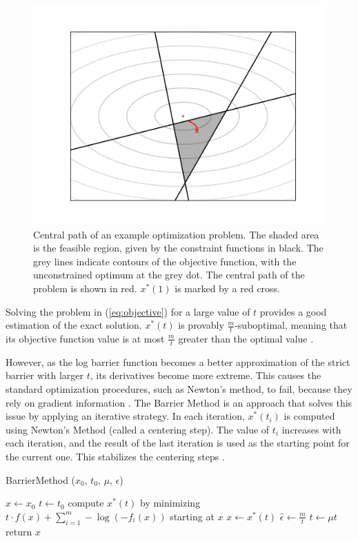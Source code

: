 \documentclass[12pt, a4paper]{report}
\begin{document}
\begin{figure}
    \centering
    \includegraphics[scale=0.6]{figs/barrier_method_example.png}
    \caption{Central path of an example optimization problem. The shaded area is the feasible region, given by the constraint functions in black. The grey lines indicate contours of the objective function, with the unconstrained optimum at the grey dot. The central path of the problem is shown in red. $x^*(1)$ is marked by a red cross.}
    \label{fig:barrier_method_example}
\end{figure}

Solving the problem in (\ref{eq:objective}) for a large value of $t$ provides a good estimation of the exact solution.
$x^*(t)$ is provably $\frac{m}{t}$-suboptimal, meaning that its objective function value is at most $\frac{m}{t}$ greater than the optimal value \cite{boyd}.

However, as the log barrier function becomes a better approximation of the strict barrier with larger $t$, its derivatives become more extreme.
This causes the standard optimization procedures, such as Newton's method, to fail, because they rely on gradient information \cite[564]{boyd}.
The Barrier Method is an approach that solves this issue by applying an iterative strategy.
In each iteration, $x^*(t_i)$ is computed using Newton's Method (called a centering step).
The value of $t_i$ increases with each iteration, and the result of the last iteration is used as the starting point for the current one.
This stabilizes the centering steps \cite[569]{boyd}.

\begin{algorithm}
    \caption[The basic Barrier Method.]{BarrierMethod ($x_0$, $t_0$, $\mu$, $\epsilon$)}
    \label{alg:product_axes}
    \begin{algorithmic}
        \State $x \gets x_0$
        \State $t \gets t_0$
        \Repeat
            \State compute $x^*(t)$ by minimizing $t \cdot f(x) + \sum_{i=1}^m -\log(-f_i(x))$ starting at $x$
            \State $x \gets x^*(t)$
            \State $\hat{\epsilon} \gets \frac{m}{t}$
            \State $t \gets \mu t$
        \Until{$\hat{\epsilon} < \epsilon$}
        \State return $x$
    \end{algorithmic}
\end{algorithm}
\end{document}
